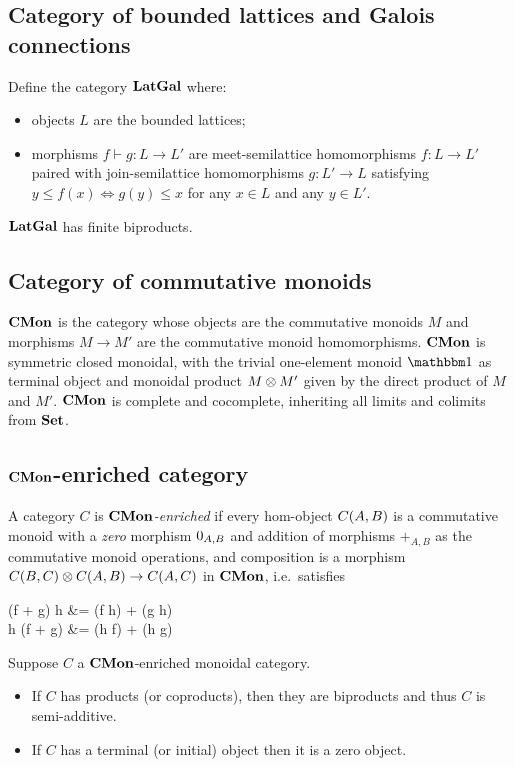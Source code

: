 
\subsection{Category of bounded lattices and Galois connections}

Define the category $\mathbf{LatGal}$ where:
\begin{itemize}
\item objects $L$ are the bounded lattices;
\item morphisms $f \vdash g: L \to L'$ are meet-semilattice homomorphisms $f: L \to L'$ paired with
join-semilattice homomorphisms $g: L' \to L$ satisfying $y \leq f(x) \iff g(y) \leq x$ for any $x \in L$ and any
$y \in L'$.
\end{itemize}

\noindent $\mathbf{LatGal}$ has finite biproducts. 

\subsection{Category of commutative monoids}

$\mathbf{CMon}$ is the category whose objects are the commutative monoids $M$ and morphisms $M \to M'$ are the
commutative monoid homomorphisms. $\mathbf{CMon}$ is symmetric closed monoidal, with the trivial one-element monoid
$\One$ as terminal object and monoidal product $M \otimes M'$ given by the direct product of $M$ and $M'$.
$\mathbf{CMon}$ is complete and cocomplete, inheriting all limits and colimits from $\mathbf{Set}$.

\subsection{$\mathbf{CMon}$-enriched category}

A category $C$ is \emph{$\mathbf{CMon}$-enriched} if every hom-object ${C}(A,B)$ is a commutative monoid with a
\emph{zero} morphism $0_{A,B}$ and addition of morphisms $+_{A,B}$ as the commutative monoid operations,
and composition is a morphism ${C}(B,C) \otimes {C}(A,B) \to {C}(A,C)$ in $\mathbf{CMon}$,
i.e.~satisfies

\begin{salign*}
(f + g) \comp h &= (f \comp h) + (g \comp h) \\
h \comp (f + g) &= (h \comp f) + (h \comp g)
\end{salign*}

\begin{proposition}
Suppose $C$ a $\mathbf{CMon}$-enriched monoidal category.
\begin{itemize}
\item If $C$ has products (or coproducts), then they are biproducts and thus $C$ is semi-additive.
\item If $C$ has a terminal (or initial) object then it is a zero object.
\end{itemize}
\end{proposition}

